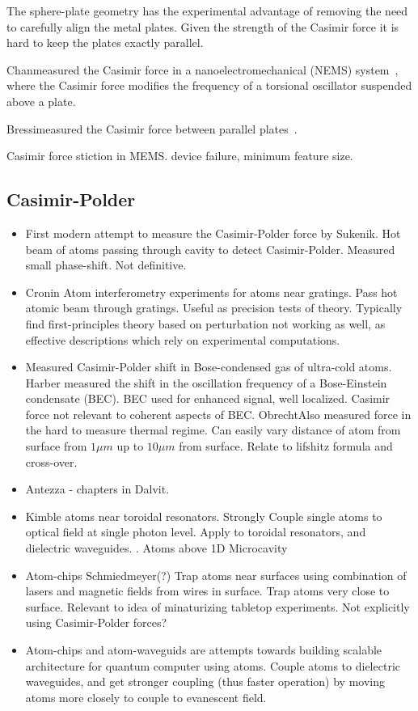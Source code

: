 The sphere-plate geometry has the experimental advantage of removing the need to carefully
align the metal plates.  Given the strength of the Casimir force it is hard to 
keep the plates exactly parallel.  

Chan\etal measured the Casimir force in a nanoelectromechanical (NEMS) system~\cite{Chan2001},
where the Casimir force modifies the frequency of a torsional oscillator suspended
above a plate.  

Bressi\etal measured the Casimir force between parallel plates~\cite{Bressi2002}.  

Casimir force stiction in MEMS.  device failure, minimum feature size.~\cite{Buks2001}

\subsection{Casimir-Polder}
\begin{itemize}
\item First modern attempt to measure the Casimir-Polder force by Sukenik\etal\cite{Sukenik1993}.
  Hot beam of atoms passing through cavity to detect Casimir-Polder.  
  Measured small phase-shift.  Not definitive. 
\item Cronin \cite{Perreault2005,Lonij2009}  Atom interferometry experiments for atoms near gratings.
  Pass hot atomic beam through gratings.  Useful as precision tests of theory.  
  Typically find first-principles theory based on perturbation not working as well,
  as effective descriptions which rely on experimental computations.  
\item Measured Casimir-Polder shift in Bose-condensed gas of ultra-cold atoms.
  Harber\etal\cite{Harber2005} measured the shift in the oscillation frequency
  of a Bose-Einstein condensate (BEC).  BEC used for enhanced signal, well localized.
  Casimir force not relevant to coherent aspects of BEC.
  Obrecht\etal\cite{Obrecht2007}Also measured force in the hard to measure thermal regime.  
  Can easily vary distance of atom from surface from $1\mu m$ up to $10\mu m$ from surface.
  Relate to lifshitz formula and cross-over.    
\item Antezza - chapters in Dalvit.  
\item Kimble atoms near toroidal resonators.
  Strongly Couple single atoms to optical field at single photon level.  
  Apply to toroidal resonators, and dielectric waveguides.  
  \cite{Alton2011}.
  Atoms above 1D Microcavity \cite{Hung2013}
\item Atom-chips  Schmiedmeyer\cite{Folman2000,Schneider2003}(?)  
  Trap atoms near surfaces using combination of lasers and magnetic fields from
  wires in surface.  Trap atoms very close to surface.  Relevant to idea of 
  minaturizing tabletop experiments.  
  Not explicitly using Casimir-Polder forces?  
\item Atom-chips and atom-waveguids are attempts towards building scalable 
architecture for quantum computer using atoms.
Couple atoms to dielectric waveguides, and get stronger coupling (thus faster operation)
by moving atoms more closely to couple to evanescent field.  
\end{itemize}
